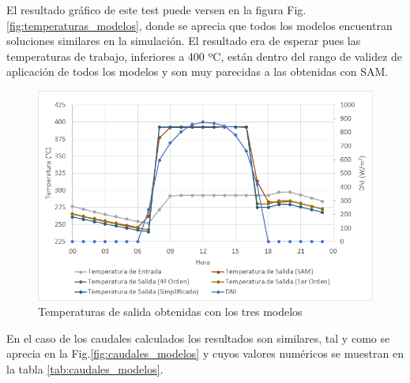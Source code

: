 El resultado gráfico de este test puede versen en la figura Fig.\ref{fig:temperaturas_modelos}, donde se aprecia que todos los modelos encuentran soluciones similares en la simulación. El resultado era de esperar pues las temperaturas de trabajo, inferiores a 400 ºC, están dentro del rango de validez de aplicación de todos los modelos y son muy parecidas a las obtenidas con SAM.

\begin{figure}[h!]
\includegraphics[width=0.9\linewidth]{images/temperaturas_modelos.png}
\caption{Temperaturas de salida obtenidas con los tres modelos} 
\label{fig:temperturas_modelos}
\end{figure}

En el caso de los caudales calculados los resultados son similares, tal y como se aprecia en la Fig.\ref{fig:caudales_modelos} y cuyos valores numéricos se muestran en la tabla \ref{tab:caudales_modelos}.

